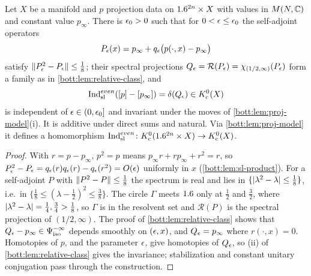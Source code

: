 \begin{proposition}\label{bott:prop:even-sl}
  Let $X$ be a manifold and $p$ projection data on $1.6^{2n}\times X$ with values in
  $M(N,\mathbb{C})$ and constant value $p_\infty$. There is $\epsilon_0>0$ such that for
  $0<\epsilon\le\epsilon_0$ the self-adjoint operators
  \begin{equation*}
    P_\epsilon(x)=p_\infty+q_\epsilon\bigl(p(\cdot,x)-p_\infty\bigr)
  \end{equation*}
  satisfy $\lVert P_\epsilon^2-P_\epsilon\rVert\le\frac18$; their spectral projections
  $Q_\epsilon=\mathcal R(P_\epsilon)=\chi_{(1/2,\infty)}(P_\epsilon)$ form a family as in
  \cref{bott:lem:relative-class}, and
  \begin{equation*}
    \operatorname{Ind}^{even}_{\mathrm{sl}}([p]-[p_\infty])=\delta(Q_\epsilon)\in K_{\mathrm{c}}^0(X)
  \end{equation*}
  is independent of $\epsilon\in(0,\epsilon_0]$ and invariant under the moves of
  \cref{bott:lem:proj-model}(i). It is additive under direct sums and natural. Via
  \cref{bott:lem:proj-model} it defines a homomorphism
  $\operatorname{Ind}^{even}_{\mathrm{sl}}\colon K_{\mathrm{c}}^0(1.6^{2n}\times X)\to K_{\mathrm{c}}^0(X)$.
\end{proposition}
\begin{proof}
  With $r=p-p_\infty$, $p^2=p$ means $p_\infty r+rp_\infty+r^2=r$, so
  $P_\epsilon^2-P_\epsilon=q_\epsilon(r)q_\epsilon(r)-q_\epsilon(r^2)=O(\epsilon)$ uniformly in $x$
  (\cref{bott:lem:sl-product}). For a self-adjoint $P$ with $\lVert P^2-P\rVert\le\frac18$ the
  spectrum is real and lies in $\{\lvert \lambda^2-\lambda\rvert\le\frac18\}$, i.e.\ in
  $\{\frac18\le(\lambda-\frac12)^2\le\frac38\}$. The circle $\Gamma$ meets $1.6$ only at
  $\frac12$ and $\frac32$, where $\lvert \lambda^2-\lambda\rvert=\frac14,\frac34>\frac18$, so
  $\Gamma$ is in the resolvent set and
  $\mathcal R(P)$ is the spectral projection of $(1/2,\infty)$. The proof of
  \cref{bott:lem:relative-class} shows that $Q_\epsilon-p_\infty\in\Psi^{-\infty}_{\mathrm{iso}}$ depends
  smoothly on $(\epsilon,x)$, and $Q_\epsilon=p_\infty$ where $r(\cdot,x)=0$. Homotopies of $p$,
  and the parameter $\epsilon$, give homotopies of $Q_\epsilon$, so (ii) of
  \cref{bott:lem:relative-class} gives the invariance; stabilization and constant unitary
  conjugation pass through the construction.
\end{proof}

